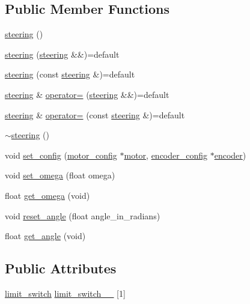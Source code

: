 \subsection*{Public Member Functions}
\begin{DoxyCompactItemize}
\item 
\mbox{\hyperlink{classsteering_a55383df3b5eb0bbd66cd9ef76c82b588}{steering}} ()
\item 
\mbox{\hyperlink{classsteering_ac941b5d9c6daae87122f984819606475}{steering}} (\mbox{\hyperlink{classsteering}{steering}} \&\&)=default
\item 
\mbox{\hyperlink{classsteering_a5646ad884f0949253988d9a8ebec8278}{steering}} (const \mbox{\hyperlink{classsteering}{steering}} \&)=default
\item 
\mbox{\hyperlink{classsteering}{steering}} \& \mbox{\hyperlink{classsteering_aab3b80efec6ef14734213ec15c228543}{operator=}} (\mbox{\hyperlink{classsteering}{steering}} \&\&)=default
\item 
\mbox{\hyperlink{classsteering}{steering}} \& \mbox{\hyperlink{classsteering_ab6e1570939ecfb89acb3905efe6cb334}{operator=}} (const \mbox{\hyperlink{classsteering}{steering}} \&)=default
\item 
\mbox{\hyperlink{classsteering_a9b686e0fb626c3e8dd16ee5106a842b7}{$\sim$steering}} ()
\item 
void \mbox{\hyperlink{classsteering_a849eba14376618441a86e0ccdc1dc066}{set\+\_\+config}} (\mbox{\hyperlink{structmotor__config}{motor\+\_\+config}} $\ast$\mbox{\hyperlink{classmotor}{motor}}, \mbox{\hyperlink{structencoder__config}{encoder\+\_\+config}} $\ast$\mbox{\hyperlink{classencoder}{encoder}})
\item 
void \mbox{\hyperlink{classsteering_a3f041a24795b6f4f886f46ca23dbc3e6}{set\+\_\+omega}} (float omega)
\item 
float \mbox{\hyperlink{classsteering_a925978d3d3c42042b56d52a2dc049371}{get\+\_\+omega}} (void)
\item 
void \mbox{\hyperlink{classsteering_ab0fb97c4af86a1d5ed668a58fba15ba3}{reset\+\_\+angle}} (float angle\+\_\+in\+\_\+radians)
\item 
float \mbox{\hyperlink{classsteering_aa2e30069b2a7d5ec7c4d8eeb0e30da32}{get\+\_\+angle}} (void)
\end{DoxyCompactItemize}
\subsection*{Public Attributes}
\begin{DoxyCompactItemize}
\item 
\mbox{\hyperlink{structlimit__switch}{limit\+\_\+switch}} \mbox{\hyperlink{classsteering_a8f20b7cbd6755817c0ac42370d91d173}{limit\+\_\+switch\+\_\+\+\_\+}} \mbox{[}1\mbox{]}
\end{DoxyCompactItemize}
